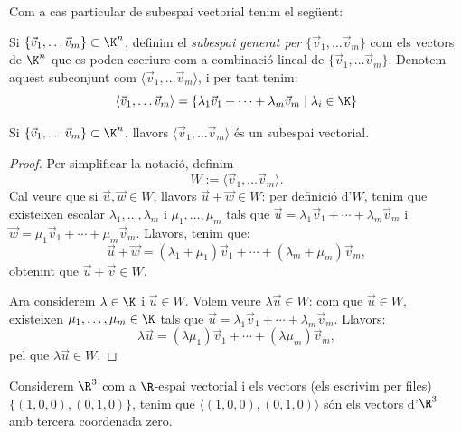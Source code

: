 Com a cas particular de subespai vectorial tenim el següent:
\begin{definicio}\label{def:subespaigenerat}
	Si $\{\vec v_1, \dots \vec v_m\}\subset \K^n$, definim el \emph{subespai generat per $\{\vec v_1, \dots \vec v_m\}$} com els vectors de $\K^n$ que es poden escriure com a combinació lineal de $\{\vec v_1, \dots \vec v_m\}$. Denotem aquest subconjunt com $\langle \vec v_1, \dots \vec v_m \rangle$, i per tant tenim:
	$$
	\langle \vec v_1, \dots \vec v_m \rangle = \{\lambda_1 \vec v_1 + \cdots + \lambda_m\vec v_m \mid \lambda_i\in\K \}
	$$
\end{definicio}
\begin{observacio}
	Si $\{\vec v_1, \dots \vec v_m\}\subset \K^n$, llavors $\langle \vec v_1, \dots \vec v_m \rangle$ és un subespai vectorial.
\end{observacio}
\begin{proof} Per simplificar la notació, definim 
	$$
	W:=\langle \vec v_1, \dots \vec v_m \rangle .
	$$
	Cal veure que si $\vec u, \vec w \in W$, llavors $\vec u+\vec w \in W$: per definició d'$W$, tenim que existeixen escalar $\lambda_1, \dots ,\lambda_m$ i $\mu_1,\dots,\mu_m$ tals que $\vec u= \lambda_1 \vec v_1+\cdots +\lambda_m\vec v_m$ i $\vec w=\mu_1\vec v_1+\cdots +\mu_m\vec v_m$. Llavors, tenim que:
	$$
	\vec u+\vec w = (\lambda_1+\mu_1)\vec v_1 + \cdots + (\lambda_m+\mu_m)\vec v_m ,
	$$
	obtenint que $\vec u+\vec v \in W$.
	
	Ara considerem $\lambda \in \K$ i $\vec u\in W$. Volem veure $\lambda \vec u \in W$: com que $\vec u\in W$, existeixen $\mu_1, \dots , \mu_m\in\K$ tals que $\vec u=\lambda_1\vec v_1 + \cdots + \lambda_m\vec v_m$. Llavors:
	$$
	\lambda \vec u = (\lambda \mu_1)\vec v_1 + \cdots + (\lambda \mu_m)\vec v_m ,
	$$
	pel que $\lambda \vec u \in W$.
\end{proof}
\begin{exemple}
	Considerem $\R^3$ com a $\R$-espai vectorial i els vectors (els escrivim per files) $\{(1,0,0),(0,1,0)\}$, tenim que $\langle (1,0,0),(0,1,0)\rangle$ són els vectors d'$\R^3$ amb tercera coordenada zero.
\end{exemple}

